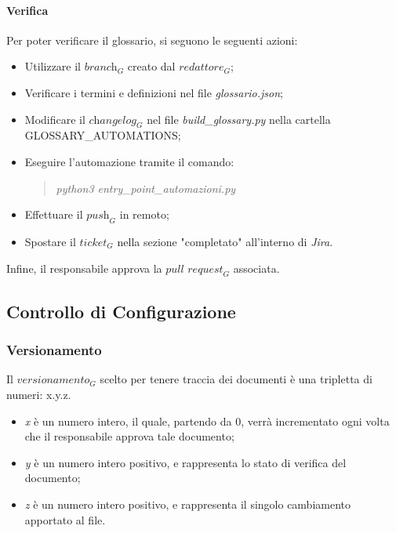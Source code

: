 \paragraph{Verifica} Per poter verificare il glossario, si seguono le seguenti azioni:
\begin{itemize}
    \item Utilizzare il $\textit{branch}_G$ creato dal $\textit{redattore}_G$;
    \item Verificare i termini e definizioni nel file \emph{glossario.json};
    \item Modificare il $\textit{changelog}_G$ nel file \emph{build\_glossary.py} nella cartella GLOSSARY\_AUTOMATIONS;
    \item Eseguire l'automazione tramite il comando:
        \begin{quote}
            \emph{  python3 entry\_point\_automazioni.py} 
        \end{quote}
    \item Effettuare il $\textit{push}_G$ in remoto;
    \item Spostare il $\textit{ticket}_G$ nella sezione "completato" all'interno di \emph{Jira}.
\end{itemize}
Infine, il responsabile approva la $\textit{pull request}_G$ associata.

\subsection{Controllo di Configurazione}

\subsubsection{Versionamento}
Il $\textit{versionamento}_G$ scelto per tenere traccia dei documenti è una tripletta di numeri: x.y.z.

\begin{itemize}
    \item \textit{x} è un numero intero, il quale, partendo da 0, verrà incrementato ogni volta che il responsabile approva tale documento;
    \item \textit{y} è un numero intero positivo, e rappresenta lo stato di verifica del documento;
    \item \textit{z} è un numero intero positivo, e rappresenta il singolo cambiamento apportato al file.
\end{itemize}

